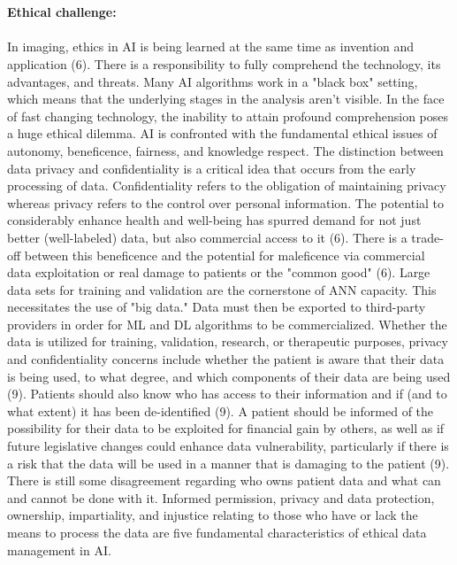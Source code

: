 \documentclass[12pt]{article}
\begin{document}
\\ \\

\noindent \textbf{\large Ethical challenge:} \\ \\ In imaging, ethics in AI is being learned at the same time as invention and application (6). There is a
responsibility to fully comprehend the technology, its advantages, and threats. Many AI algorithms work in a
"black box" setting, which means that the underlying stages in the analysis aren't visible. In the face of fast
changing technology, the inability to attain profound comprehension poses a huge ethical dilemma. AI is
confronted with the fundamental ethical issues of autonomy, beneficence, fairness, and knowledge respect. The
distinction between data privacy and confidentiality is a critical idea that occurs from the early processing of
data. Confidentiality refers to the obligation of maintaining privacy whereas privacy refers to the control over
personal information. The potential to considerably enhance health and well-being has spurred demand for not
just better (well-labeled) data, but also commercial access to it (6). There is a trade-off between this
beneficence and the potential for maleficence via commercial data exploitation or real damage to patients or
the "common good" (6). Large data sets for training and validation are the cornerstone of ANN capacity. This
necessitates the use of "big data." Data must then be exported to third-party providers in order for ML and DL
algorithms to be commercialized. Whether the data is utilized for training, validation, research, or therapeutic
purposes, privacy and confidentiality concerns include whether the patient is aware that their data is being used, to what degree, and which components of their data are being used (9). Patients should also know who has
access to their information and if (and to what extent) it has been de-identified (9). A patient should be
informed of the possibility for their data to be exploited for financial gain by others, as well as if future
legislative changes could enhance data vulnerability, particularly if there is a risk that the data will be used in a
manner that is damaging to the patient (9). There is still some disagreement regarding who owns patient data
and what can and cannot be done with it. Informed permission, privacy and data protection, ownership,
impartiality, and injustice relating to those who have or lack the means to process the data are five fundamental
characteristics of ethical data management in AI.
\end{document}
